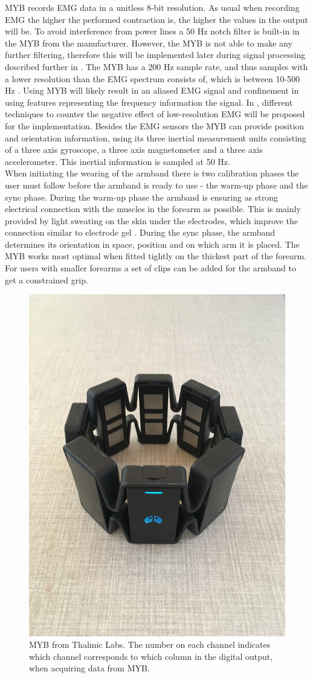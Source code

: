 MYB records EMG data in a unitless 8-bit resolution. As usual when recording EMG the higher the performed contraction is, the higher the values in the output will be. To avoid interference from power lines a 50 Hz notch filter is built-in in the MYB from the manufacturer. However, the MYB is not able to make any further filtering, therefore this will be implemented later during signal processing described further in . The MYB has a 200 Hz sample rate, and thus samples with a lower resolution than the EMG spectrum consists of, which is between 10-500 Hz \cite{Cram2012}. Using MYB will likely result in an aliased EMG signal and confinement in using features representing the frequency information the signal. In , different techniques to counter the negative effect of low-resolution EMG will be proposed for the implementation. 
Besides the EMG sensors the MYB can provide position and orientation information, using its three inertial measurement units consisting of a three axis gyroscope, a three axis magnetometer and a three axis accelerometer. This inertial information is sampled at 50 Hz. \cite{Myoarmband2013} \\
When initiating the wearing of the armband there is two calibration phases the user must follow before the armband is ready to use - the warm-up phase and the sync phase. During the warm-up phase the armband is ensuring as strong electrical connection with the muscles in the forearm as possible. This is mainly provided by light sweating on the skin under the electrodes, which improve the connection similar to electrode gel \cite{Cram2012}. During the sync phase, the armband determines its orientation in space, position and on which arm it is placed. The MYB works most optimal when fitted tightly on the thickest part of the forearm. For users with smaller forearms a set of clips can be added for the armband to get a constrained grip. \cite{Myoarmband2013}

\begin{figure}[H]                 
	\includegraphics[width=.4\textwidth]{figures/xBackground/myoband}  
	\caption{MYB from Thalmic Labs. The number on each channel indicates which channel corresponds to which column in the digital output, when acquiring data from MYB.}
	\label{fig:myoarmband} 
\end{figure}